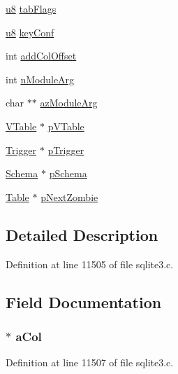 \begin{DoxyCompactItemize}
\item 
\hyperlink{sqlite3_8c_a74a0f6424ae628af25f23f0a35f6ead3}{u8} \hyperlink{struct_table_a3db3f3d875fa7b0edd741ba992840e27}{tab\+Flags}
\item 
\hyperlink{sqlite3_8c_a74a0f6424ae628af25f23f0a35f6ead3}{u8} \hyperlink{struct_table_af3fe9dbb2acd8a6e9612f31ef9840ac5}{key\+Conf}
\item 
int \hyperlink{struct_table_abedfd891b3393138e3e1aaf77459a3f9}{add\+Col\+Offset}
\item 
int \hyperlink{struct_table_a14a173059f6fd84cc6cd6bd8afdb22e6}{n\+Module\+Arg}
\item 
char $\ast$$\ast$ \hyperlink{struct_table_a5b721c369ead989ee430d0cce74cac2b}{az\+Module\+Arg}
\item 
\hyperlink{struct_v_table}{V\+Table} $\ast$ \hyperlink{struct_table_a8d76cc75cc811868888fbf6bf8b3a460}{p\+V\+Table}
\item 
\hyperlink{struct_trigger}{Trigger} $\ast$ \hyperlink{struct_table_a93ec67e81c981e01944d8fc6ab564fec}{p\+Trigger}
\item 
\hyperlink{struct_schema}{Schema} $\ast$ \hyperlink{struct_table_ac262c2ca980f0326edbe82bbe7fda205}{p\+Schema}
\item 
\hyperlink{struct_table}{Table} $\ast$ \hyperlink{struct_table_a2c75a77cbf15e71f861a82754851142f}{p\+Next\+Zombie}
\end{DoxyCompactItemize}


\subsection{Detailed Description}


Definition at line 11505 of file sqlite3.\+c.



\subsection{Field Documentation}
\hypertarget{struct_table_a2da93dd6a8de10f66932ab892192c497}{}
\subsubsection[{a\+Col}]{$\ast$ a\+Col}\label{struct_table_a2da93dd6a8de10f66932ab892192c497}


Definition at line 11507 of file sqlite3.\+c.




